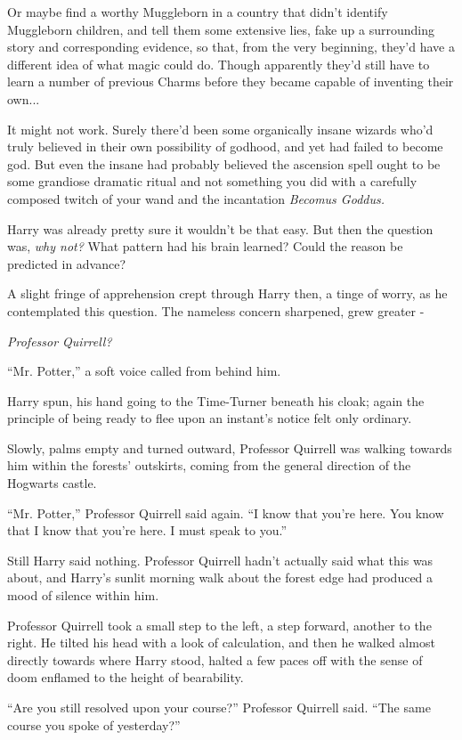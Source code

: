 Or maybe find a worthy Muggleborn in a country that didn't identify Muggleborn children, and tell them some extensive lies, fake up a surrounding story and corresponding evidence, so that, from the very beginning, they'd have a different idea of what magic could do. Though apparently they'd still have to learn a number of previous Charms before they became capable of inventing their own...

It might not work. Surely there'd been some organically insane wizards who'd truly believed in their own possibility of godhood, and yet had failed to become god. But even the insane had probably believed the ascension spell ought to be some grandiose dramatic ritual and not something you did with a carefully composed twitch of your wand and the incantation \emph{Becomus Goddus.}

Harry was already pretty sure it wouldn't be that easy. But then the question was, \emph{why not?} What pattern had his brain learned? Could the reason be predicted in advance?

A slight fringe of apprehension crept through Harry then, a tinge of worry, as he contemplated this question. The nameless concern sharpened, grew greater -

\emph{Professor Quirrell?}

``Mr. Potter,'' a soft voice called from behind him.

Harry spun, his hand going to the Time-Turner beneath his cloak; again the principle of being ready to flee upon an instant's notice felt only ordinary.

Slowly, palms empty and turned outward, Professor Quirrell was walking towards him within the forests' outskirts, coming from the general direction of the Hogwarts castle.

``Mr. Potter,'' Professor Quirrell said again. ``I know that you're here. You know that I know that you're here. I must speak to you.''

Still Harry said nothing. Professor Quirrell hadn't actually said what this was about, and Harry's sunlit morning walk about the forest edge had produced a mood of silence within him.

Professor Quirrell took a small step to the left, a step forward, another to the right. He tilted his head with a look of calculation, and then he walked almost directly towards where Harry stood, halted a few paces off with the sense of doom enflamed to the height of bearability.

``Are you still resolved upon your course?'' Professor Quirrell said. ``The same course you spoke of yesterday?''

